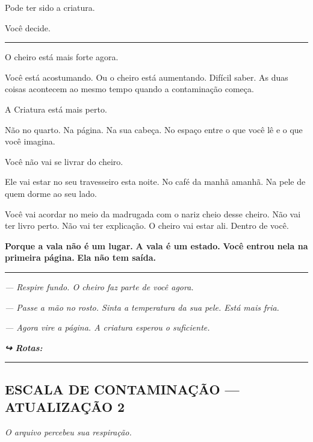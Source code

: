 \noindent Pode ter sido a criatura.

\noindent Você decide.

\vspace{0.5em}\noindent\rule{\textwidth}{0.5pt}\vspace{0.5em}

\noindent O cheiro está mais forte agora.

\noindent Você está acostumando. Ou o cheiro está aumentando. Difícil saber. As duas coisas acontecem ao mesmo tempo quando a contaminação começa.

\noindent A Criatura está mais perto.

\noindent Não no quarto. Na página. Na sua cabeça. No espaço entre o que você lê e o que você imagina.

\noindent Você não vai se livrar do cheiro.

\noindent Ele vai estar no seu travesseiro esta noite.
No café da manhã amanhã.
Na pele de quem dorme ao seu lado.

\noindent Você vai acordar no meio da madrugada com o nariz cheio desse cheiro.
Não vai ter livro perto.
Não vai ter explicação.
O cheiro vai estar ali. Dentro de você.

\noindent \textbf{Porque a vala não é um lugar.}
\textbf{A vala é um estado.}
\textbf{Você entrou nela na primeira página.}
\textbf{Ela não tem saída.}

\vspace{0.5em}\noindent\rule{\textwidth}{0.5pt}\vspace{0.5em}

\noindent \textit{--- Respire fundo. O cheiro faz parte de você agora.}

\noindent \textit{--- Passe a mão no rosto. Sinta a temperatura da sua pele. Está mais fria.}

\noindent \textit{--- Agora vire a página. A criatura esperou o suficiente.}


\noindent\textit{\textbf{↪ Rotas:}  \rotasep {}}

\vspace{0.5em}\noindent\rule{\textwidth}{0.5pt}\vspace{0.5em}

\subsection*{ESCALA DE CONTAMINAÇÃO --- ATUALIZAÇÃO 2}

\noindent \textit{O arquivo percebeu sua respiração.}

